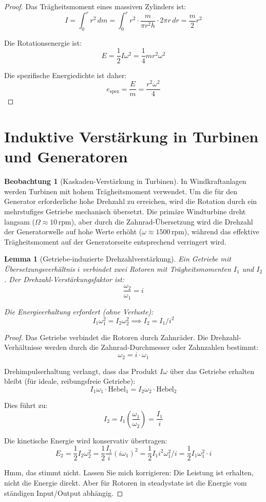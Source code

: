 \documentclass[12pt,a4paper]{report}
\theoremstyle{plain}
\newtheorem{lemma}[theorem]{Lemma}
\theoremstyle{definition}
\newtheorem{beobachtung}[theorem]{Beobachtung}
\theoremstyle{remark}
\begin{document}
\begin{proof}
	Das Trägheitsmoment eines massiven Zylinders ist:
	\[
	I = \int_0^r r^2 \, dm = \int_0^r r^2 \cdot \frac{m}{\pi r^2 h} \cdot 2\pi r \, dr = \frac{m}{2} r^2
	\]
	
	Die Rotationsenergie ist:
	\[
	E = \frac{1}{2} I \omega^2 = \frac{1}{4} m r^2 \omega^2
	\]
	
	Die spezifische Energiedichte ist daher:
	\[
	e_{\text{spez}} = \frac{E}{m} = \frac{r^2 \omega^2}{4}
	\]
\end{proof}

\section{Induktive Verstärkung in Turbinen und Generatoren}

\begin{beobachtung}[Kaskaden-Verstärkung in Turbinen]
	In Windkraftanlagen werden Turbinen mit hohem Trägheitsmoment verwendet. 
Um die für den Generator erforderliche hohe Drehzahl zu erreichen, wird 
die Rotation durch ein mehrstufiges Getriebe mechanisch übersetzt. 
Die primäre Windturbine dreht langsam ($\Omega \approx 10\,\text{rpm}$), 
aber durch die Zahnrad-Übersetzung wird die Drehzahl der Generatorwelle 
auf hohe Werte erhöht ($\omega \approx 1500\,\text{rpm}$), während das 
effektive Trägheitsmoment auf der Generatorseite entsprechend verringert wird.
\end{beobachtung}

\begin{lemma}[Getriebe-induzierte Drehzahlverstärkung]
	Ein Getriebe mit Übersetzungsverhältnis $i$ verbindet zwei Rotoren mit Trägheitsmomenten $I_1$ und $I_2$. Der Drehzahl-Verstärkungsfaktor ist:
	\[
	\frac{\omega_2}{\omega_1} = i
	\]
	
	Die Energieerhaltung erfordert (ohne Verluste):
	\[
	I_1 \omega_1^2 = I_2 \omega_2^2 \implies I_2 = I_1 / i^2
	\]
\end{lemma}

\begin{proof}
	Das Getriebe verbindet die Rotoren durch Zahnräder. Die Drehzahl-Verhältnisse werden durch die Zahnrad-Durchmesser oder Zahnzahlen bestimmt:
	\[
	\omega_2 = i \cdot \omega_1
	\]
	
	Drehimpulserhaltung verlangt, dass das Produkt $I \omega$ über das Getriebe erhalten bleibt (für ideale, reibungsfreie Getriebe):
	\[
	I_1 \omega_1 \cdot \text{Hebel}_1 = I_2 \omega_2 \cdot \text{Hebel}_2
	\]
	
	Dies führt zu:
	\[
	I_2 = I_1 \left(\frac{\omega_1}{\omega_2}\right) = \frac{I_1}{i}
	\]
	
	Die kinetische Energie wird konservativ übertragen:
	\[
	E_2 = \frac{1}{2} I_2 \omega_2^2 = \frac{1}{2} \frac{I_1}{i} (i \omega_1)^2 = \frac{1}{2} I_1 i^2 \omega_1^2 / i = \frac{1}{2} I_1 \omega_1^2 \cdot i
	\]
	
	Hmm, das stimmt nicht. Lassen Sie mich korrigieren: Die Leistung ist erhalten, nicht die Energie direkt. Aber für Rotoren in steadystate ist die Energie vom ständigen Input/Output abhängig.
\end{proof}
\end{document}
